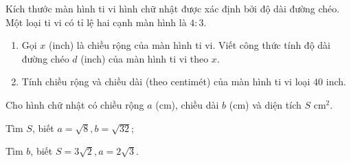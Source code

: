 \begin{bt}
Kích thước màn hình ti vi hình chữ nhật được xác định bởi độ dài đường chéo. Một loại ti vi có tỉ lệ hai cạnh màn hình là $4: 3$.
\begin{enumerate}
	\item Gọi $x$ (inch) là chiều rộng của màn hình ti vi. Viết công thức tính độ dài đường chéo $d$ (inch) của màn hình ti vi theo $x$.
	\item Tính chiều rộng và chiều dài (theo centimét) của màn hình ti vi loại $40$ inch.
\end{enumerate}	
\end{bt}
\begin{bt} 
	Cho hình chữ nhật có chiều rộng $a$ (cm), chiều dài $b$ (cm) và diện tích $S$ cm$^{2}$.
	\begin{enumEX}{2}
	\item Tìm $S$, biết $a=\sqrt{8}, b=\sqrt{32}$;
	\item Tìm $b$, biết $S=3 \sqrt{2}, a=2 \sqrt{3}$.
	\end{enumEX}
\end{bt}
